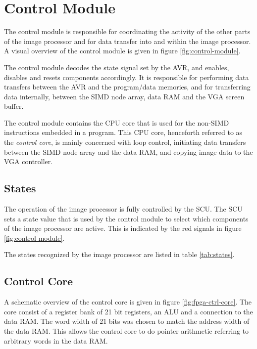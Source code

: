 \section{Control Module}

The control module is responsible for coordinating the activity of the
other parts of the image processor and for data transfer into and within
the image processor. A visual overview of the control module is given in
figure \ref{fig:control-module}.



The control module decodes the state signal set by the AVR, and enables,
disables and resets components accordingly. It is responsible for
performing data transfers between the AVR and the program/data memories,
and for transferring data internally, between the SIMD node array, data
RAM and the VGA screen buffer.

The control module contains the CPU core that is used for the non-SIMD
instructions embedded in a program. This CPU core, henceforth referred
to as the \emph{control core}, is mainly concerned with loop control,
initiating data transfers between the SIMD node array and the data RAM,
and copying image data to the VGA controller.

\subsection{States}

The operation of the image processor is fully controlled by the SCU. The
SCU sets a state value that is used by the control module to select
which components of the image processor are active. This is indicated by
the red signals in figure \ref{fig:control-module}.

The states recognized by the image processor are listed in table
\ref{tab:states}.



\subsection{Control Core}

A schematic overview of the control core is given in figure
\ref{fig:fpga-ctrl-core}. The core consist of a register bank of 21 bit
registers, an ALU and a connection to the data RAM. The word width of 21
bits was chosen to match the address width of the data RAM. This allows
the control core to do pointer arithmetic referring to arbitrary words
in the data RAM.

